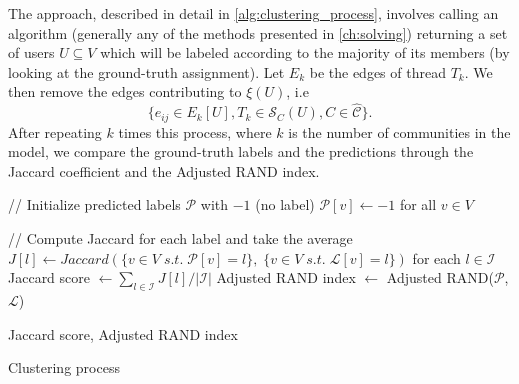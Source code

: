 The approach, described in detail in \autoref{alg:clustering_process}, involves calling an algorithm (generally any of the methods presented
in \autoref{ch:solving}) returning a set of users $U \subseteq V$ which will be
labeled according to the majority of its members (by looking at the
ground-truth assignment).
Let $E_k$ be the edges of thread $T_k$. We then remove the edges contributing to $\xi(U)$, i.e\
\begin{equation*}
	\{ e_{ij} \in E_k[U], T_k \in \mathcal{S}_{C}(U), C \in \mathcal{\hat{C}}
	\}.
\end{equation*}
After repeating $k$ times this process, where $k$ is the number
of communities in the model, we compare the ground-truth labels and the
predictions through the Jaccard coefficient and the Adjusted RAND
index\footnotemark.

\begin{algorithm}
	\SetAlgoLined

	// Initialize predicted labels $\mathcal{P} $ with $-1$ (no label)\;
	$\mathcal{P}[v] \leftarrow -1$ for all $v \in V$ \;


	// Compute Jaccard for each label and take the average \;
	$J[l] \leftarrow Jaccard( \{ v \in V \; s.t. \; \mathcal{P}[v] = l \}, \; \{ v \in
		V\; s.t. \; \mathcal{L}[v] = l \})  $ for each $l \in \mathcal{I} $ \;
	Jaccard score $\leftarrow \sum^{}_{l \in \mathcal{I} } J[l] / |\mathcal{I}|  $ \;
	Adjusted RAND index $\leftarrow $ Adjusted RAND($\mathcal{P} $, $\mathcal{L} $)
	\;

	\Return Jaccard score, Adjusted RAND index\;
	\caption{Clustering process}
	\label{alg:clustering_process}
\end{algorithm}



